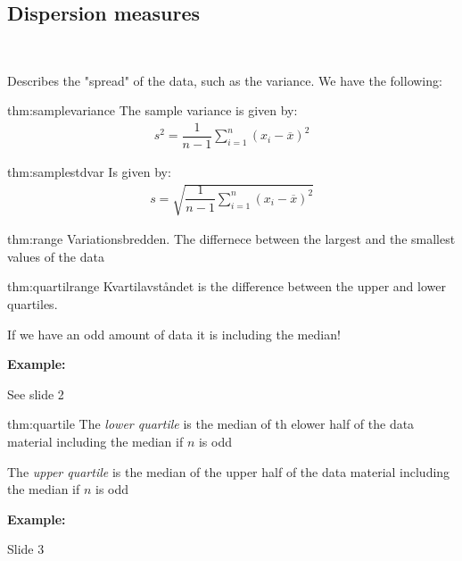 \subsection{Dispersion measures}\hfill\\\par
\noindent Describes the "spread" of the data, such as the variance. We have the following:
\par\bigskip
\begin{theo}{thm:samplevariance}
  The sample variance is given by:
  \begin{equation*}
    \begin{gathered}
      s^2 = \dfrac{1}{n-1}\sum_{i=1}^{n}(x_i-\overline{x})^2
    \end{gathered}
  \end{equation*}
\end{theo}
\par\bigskip
\begin{theo}{thm:samplestdvar}
  Is given by:
  \begin{equation*}
    \begin{gathered}
      s = \sqrt{\dfrac{1}{n-1}\sum_{i=1}^{n}(x_i-\overline{x})^2}
    \end{gathered}
  \end{equation*}
\end{theo}
\newpage
\begin{theo}[Range]{thm:range}
  Variationsbredden. The differnece between the largest and the smallest values of the data 
\end{theo}
\par\bigskip
\begin{theo}{thm:quartilrange}
  Kvartilavståndet is the difference between the upper and lower quartiles.\par
  \noindent If we have an odd amount of data it is including the median!
\end{theo}
\par\bigskip
\noindent\textbf{Example:}\par
\noindent See slide 2
\par\bigskip
\begin{theo}{thm:quartile}
  The \textit{lower quartile} is the median of th elower half of the data material including the median if $n$ is odd
  \par\bigskip
  \noindent The \textit{upper quartile} is the median of the upper half of the data material including the median if $n$ is odd
\end{theo}
\par\bigskip
\noindent\textbf{Example:}\par
\noindent Slide 3
\par\bigskip
